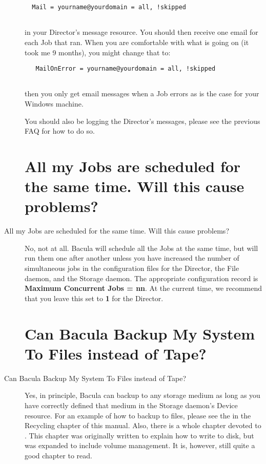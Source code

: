 \begin{description}
\footnotesize
\begin{verbatim}
  Mail = yourname@yourdomain = all, !skipped
  
\end{verbatim}
\normalsize

in your Director's message resource.  You should then receive one email for
each Job that ran.  When you are comfortable with what is going on (it took
me 9 months), you might change that to:

\footnotesize
\begin{verbatim}
   MailOnError = yourname@yourdomain = all, !skipped
   
\end{verbatim}
\normalsize

then you only get email messages when a Job errors as is the case  for your
Windows machine.  

You should also be logging the Director's messages, please see the  previous
FAQ for how to do so.  

\label{sched}
\section{All my Jobs are scheduled for the same time. Will this cause
   problems?}
\item [All my Jobs are scheduled for the same time. Will this cause
   problems? ]
   No, not at all.  Bacula will schedule all the Jobs at the same time, but
   will run them one after another unless you have increased the number of
   simultaneous jobs in the configuration files for the Director, the File
   daemon, and the Storage daemon.  The appropriate configuration record is
   {\bf Maximum Concurrent Jobs = nn}.  At the current time, we recommend
   that you leave this set to {\bf 1} for the Director.

\label{disk}
\section{Can Bacula Backup My System To Files instead of Tape?}
\item [Can Bacula Backup My System To Files instead of Tape? ]
   Yes, in principle, Bacula can backup to any storage medium as long as
   you have correctly defined that medium in the Storage daemon's Device
   resource.  For an example of how to backup to files, please see the
    in the Recycling chapter of this
   manual.  Also, there is a whole chapter devoted to .  This chapter was originally written to
   explain how to write to disk, but was expanded to include volume
   management.  It is, however, still quite a good chapter to read.


\end{description}
